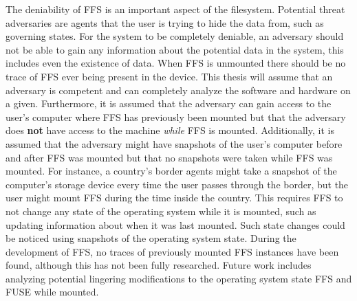 The deniability of \gls{FFS} is an important aspect of the filesystem. Potential threat adversaries are agents that the user is trying to hide the data from, such as governing states. For the system to be completely deniable, an adversary should not be able to gain any information about the potential data in the system, this includes even the existence of data. When \gls{FFS} is unmounted there should be no trace of \gls{FFS} ever being present in the device. This thesis will assume that an adversary is competent and can completely analyze the software and hardware on a given. Furthermore, it is assumed that the adversary can gain access to the user's computer where \gls{FFS} has previously been mounted but that the adversary does \textbf{not} have access to the machine \textit{while} \gls{FFS} is mounted. Additionally, it is assumed that the adversary might have snapshots of the user's computer before and after \gls{FFS} was mounted but that no snapshots were taken while \gls{FFS} was mounted. For instance, a country's border agents might take a snapshot of the computer's storage device every time the user passes through the border, but the user might mount \gls{FFS} during the time inside the country. This requires \gls{FFS} to not change any state of the operating system while it is mounted, such as updating information about when it was last mounted. Such state changes could be noticed using snapshots of the operating system state. During the development of \gls{FFS}, no traces of previously mounted \gls{FFS} instances have been found, although this has not been fully researched. Future work includes analyzing potential lingering modifications to the operating system state \gls{FFS} and \gls{FUSE} while mounted.